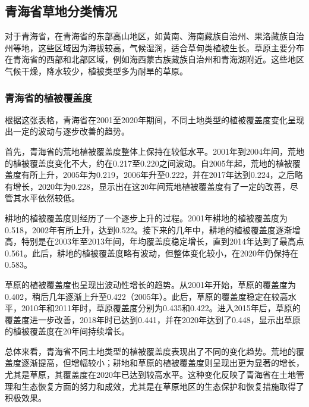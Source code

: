\documentclass[AutoFakeBold]{LZUThesis-PgD&PhD}
\begin{document}
    \subsection{青海省草地分类情况}
    \par 对于青海省，在青海省的东部高山地区，如黄南、海南藏族自治州、果洛藏族自治州等地，这些区域因为海拔较高，气候湿润，适合草甸类植被生长。草原主要分布在青海省的西部和北部区域，例如海西蒙古族藏族自治州和青海湖附近。这些地区气候干燥，降水较少，植被类型多为耐旱的草原。
    
		
    \subsubsection{青海省的植被覆盖度}

    \par
    
    根据这张表格，青海省在2001至2020年期间，不同土地类型的植被覆盖度变化呈现出一定的波动与逐步改善的趋势。
    
    首先，青海省的荒地植被覆盖度整体上保持在较低水平。2001年到2004年间，荒地的植被覆盖度变化不大，约在0.217至0.220之间波动。自2005年起，荒地的植被覆盖度有所上升，2005年为0.219，2006年升至0.222，并在2017年达到0.224，之后略有增长，2020年为0.228，显示出在这20年间荒地植被覆盖度有了一定的改善，尽管其水平依然较低。
    
    耕地的植被覆盖度则经历了一个逐步上升的过程。2001年耕地的植被覆盖度为0.518，2002年有所上升，达到0.522。接下来的几年中，耕地的植被覆盖度逐渐增高，特别是在2003年至2013年间，年均覆盖度稳定增长，直到2014年达到了最高点0.561。此后，耕地的植被覆盖度略有波动，但整体变化较小，在2020年仍保持在0.583。
    
    草原的植被覆盖度也呈现出波动性增长的趋势。从2001年开始，草原的覆盖度为0.402，稍后几年逐渐上升至0.422（2005年）。此后，草原的覆盖度稳定在较高水平，2010年和2011年时，草原覆盖度分别为0.435和0.422。进入2015年后，草原的覆盖度进一步改善，2018年时已达到0.441，并在2020年达到了0.448，显示出草原的植被覆盖度在20年间持续增长。
    
    总体来看，青海省不同土地类型的植被覆盖度表现出了不同的变化趋势。荒地的覆盖度逐渐提高，但增幅较小；耕地和草原的植被覆盖度则呈现出更为显著的增长，尤其是草原，其覆盖度在2020年已达到较高水平。这种变化反映了青海省在土地管理和生态恢复方面的努力和成效，尤其是在草原地区的生态保护和恢复措施取得了积极效果。
            
    
        
\end{document}
